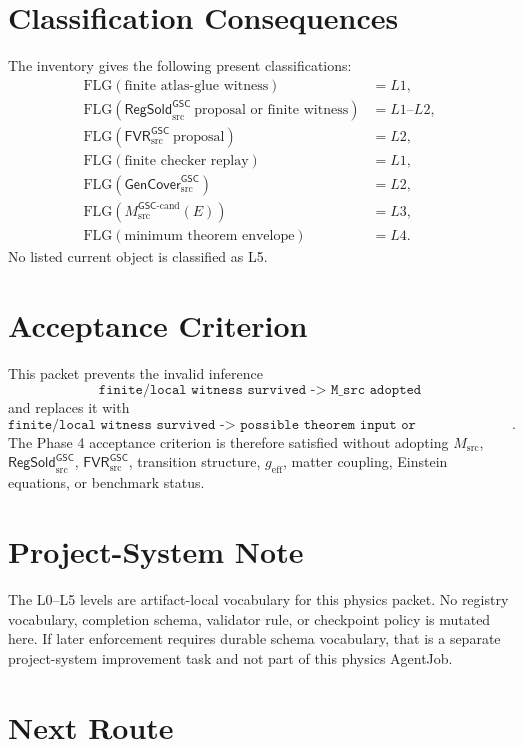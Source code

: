 \documentclass[11pt]{article}
\newcommand{\GSC}{\mathsf{GSC}}
\newcommand{\Msrc}{M_{\mathrm{src}}}
\newcommand{\Mgsccand}{M_{\mathrm{src}}^{\GSC\mbox{-}\mathrm{cand}}}
\newcommand{\GenCover}{\mathsf{GenCover}_{\mathrm{src}}^{\GSC}}
\newcommand{\RegSold}{\mathsf{RegSold}_{\mathrm{src}}^{\GSC}}
\newcommand{\FVR}{\mathsf{FVR}_{\mathrm{src}}^{\GSC}}
\newcommand{\geff}{g_{\mathrm{eff}}}
\begin{document}
\section{Classification Consequences}

The inventory gives the following present classifications:
\[
\begin{array}{ll}
\mathrm{FLG}(\text{finite atlas-glue witness}) &= L1,\\
\mathrm{FLG}(\RegSold\ \text{proposal or finite witness}) &= L1\text{--}L2,\\
\mathrm{FLG}(\FVR\ \text{proposal}) &= L2,\\
\mathrm{FLG}(\text{finite checker replay}) &= L1,\\
\mathrm{FLG}(\GenCover) &= L2,\\
\mathrm{FLG}(\Mgsccand(E)) &= L3,\\
\mathrm{FLG}(\text{minimum theorem envelope}) &= L4.
\end{array}
\]
No listed current object is classified as L5.

\section{Acceptance Criterion}

This packet prevents the invalid inference
\[
  \texttt{finite/local witness survived -> M\_src adopted}
\]
and replaces it with
\[
  \texttt{finite/local witness survived -> possible theorem input or
  counterexample surface -> adoption theorem still required}.
\]
The Phase 4 acceptance criterion is therefore satisfied without adopting
\(\Msrc\), \(\RegSold\), \(\FVR\), transition structure, \(\geff\), matter
coupling, Einstein equations, or benchmark status.

\section{Project-System Note}

The L0--L5 levels are artifact-local vocabulary for this physics packet. No
registry vocabulary, completion schema, validator rule, or checkpoint policy is
mutated here. If later enforcement requires durable schema vocabulary, that is
a separate project-system improvement task and not part of this physics
AgentJob.

\section{Next Route}
\end{document}
